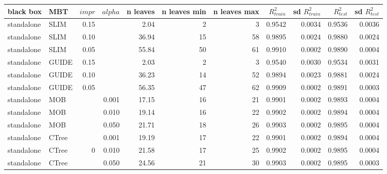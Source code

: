 \begin{table}[!htb]

\centering \tiny
\begin{tabular}[t]{l|l|r|r|r|r|r|r|r|r|r}
\hline
black box & MBT & $impr$ & $alpha$ & n leaves & n leaves min & n leaves max &  $R^2_{train}$ & sd $R^2_{train}$ & $R^2_{test}$ & sd $R^2_{test}$\\

\hline

standalone & SLIM & 0.15 & & 2.04 & 2 & 3 & 0.9542 & 0.0034 & 0.9536 & 0.0036\\
standalone & SLIM & 0.10 & & 36.94 & 15 & 58 & 0.9895 & 0.0024 & 0.9880 & 0.0024\\
standalone & SLIM & 0.05 & & 55.84 & 50 & 61 & 0.9910 & 0.0002 & 0.9890 & 0.0004\\
standalone & GUIDE & 0.15 & & 2.03 & 2 & 3 & 0.9540 & 0.0030 & 0.9534 & 0.0031\\
standalone & GUIDE & 0.10 & & 36.23 & 14 & 52 & 0.9894 & 0.0023 & 0.9881 & 0.0024\\
standalone & GUIDE & 0.05 & & 56.35 & 47 & 62 & 0.9909 & 0.0002 & 0.9891 & 0.0003\\
standalone & MOB & & 0.001 & 17.15 & 16 & 21 & 0.9901 & 0.0002 & 0.9893 & 0.0004\\
standalone & MOB & & 0.010 & 19.14 & 16 & 22 & 0.9902 & 0.0002 & 0.9894 & 0.0004\\
standalone & MOB & & 0.050 & 21.71 & 18 & 26 & 0.9903 & 0.0002 & 0.9895 & 0.0004\\
standalone & CTree & & 0.001 & 19.19 & 17 & 22 & 0.9901 & 0.0002 & 0.9894 & 0.0004\\
standalone & CTree &0 & 0.010 & 21.58 & 17 & 25 & 0.9902 & 0.0002 & 0.9895 & 0.0004\\
standalone & CTree & & 0.050 & 24.56 & 21 & 30 & 0.9903 & 0.0002 & 0.9895 & 0.0003\\



\end{tabular}
\end{table}

